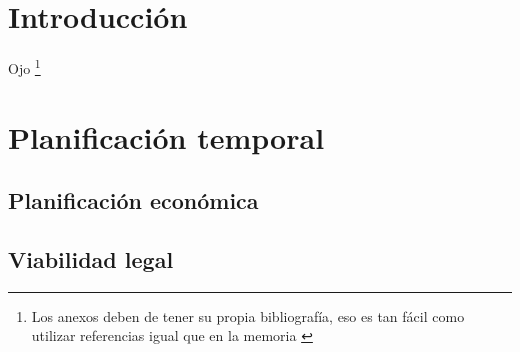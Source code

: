 
\section{Introducción}

Ojo \footnote{Los anexos deben de tener su propia bibliografía, eso es tan fácil como utilizar referencias igual que en la memoria \cite{bortolot2005}}

\section{Planificación temporal}

\subsection{Planificación económica}

\subsection{Viabilidad legal}